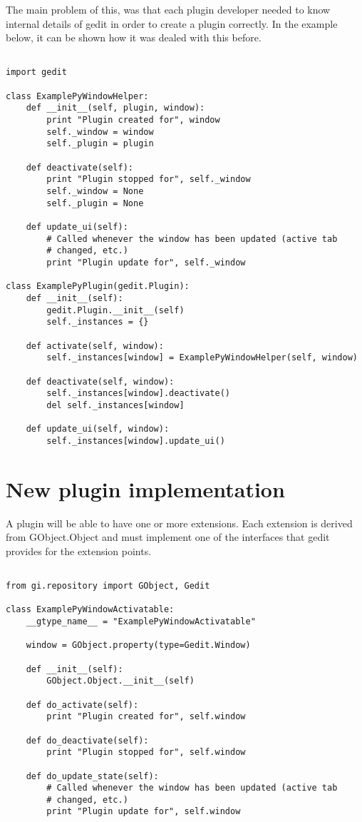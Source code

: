 The main problem of this, was that each plugin developer needed to know internal details of gedit in order to create a plugin correctly. In the example below, it can be shown how it was dealed with this before.

\begin{lstlisting}[style=python]

import gedit

class ExamplePyWindowHelper:
    def __init__(self, plugin, window):
        print "Plugin created for", window
        self._window = window
        self._plugin = plugin

    def deactivate(self):
        print "Plugin stopped for", self._window
        self._window = None
        self._plugin = None

    def update_ui(self):
        # Called whenever the window has been updated (active tab
        # changed, etc.)
        print "Plugin update for", self._window

class ExamplePyPlugin(gedit.Plugin):
    def __init__(self):
        gedit.Plugin.__init__(self)
        self._instances = {}

    def activate(self, window):
        self._instances[window] = ExamplePyWindowHelper(self, window)

    def deactivate(self, window):
        self._instances[window].deactivate()
        del self._instances[window]

    def update_ui(self, window):
        self._instances[window].update_ui()

\end{lstlisting}

\section{New plugin implementation}

A plugin will be able to have one or more extensions. Each extension is derived from GObject.Object and must implement one of the interfaces that gedit provides for the extension points.

\begin{lstlisting}[style=python]

from gi.repository import GObject, Gedit

class ExamplePyWindowActivatable:
    __gtype_name__ = "ExamplePyWindowActivatable"

    window = GObject.property(type=Gedit.Window)

    def __init__(self):
        GObject.Object.__init__(self)

    def do_activate(self):
        print "Plugin created for", self.window

    def do_deactivate(self):
        print "Plugin stopped for", self.window

    def do_update_state(self):
        # Called whenever the window has been updated (active tab
        # changed, etc.)
        print "Plugin update for", self.window

\end{lstlisting}

